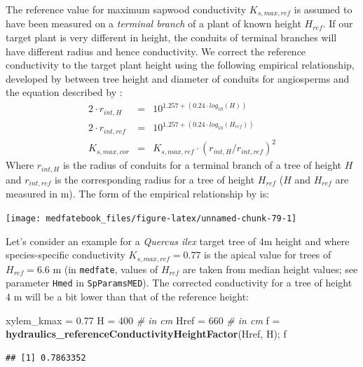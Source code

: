 \documentclass[]{book}
\newenvironment{Shaded}{\begin{snugshade}}{\end{snugshade}}
\newcommand{\KeywordTok}[1]{\textcolor[rgb]{0.13,0.29,0.53}{\textbf{#1}}}
\newcommand{\DecValTok}[1]{\textcolor[rgb]{0.00,0.00,0.81}{#1}}
\newcommand{\FloatTok}[1]{\textcolor[rgb]{0.00,0.00,0.81}{#1}}
\newcommand{\StringTok}[1]{\textcolor[rgb]{0.31,0.60,0.02}{#1}}
\newcommand{\CommentTok}[1]{\textcolor[rgb]{0.56,0.35,0.01}{\textit{#1}}}
\newcommand{\NormalTok}[1]{#1}
\begin{document}
The reference value for maximum sapwood conductivity \(K_{s,max,ref}\) is assumed to have been measured on a \emph{terminal branch} of a plant of known height \(H_{ref}\). If our target plant is very different in height, the conduits of terminal branches will have different radius and hence conductivity. We correct the reference conductivity to the target plant height using the following empirical relationship, developed by \citet{Olson2014} between tree height and diameter of conduits for angiosperms and the equation described by \citet{Christoffersen2016}:
\begin{eqnarray}
2 \cdot r_{int,H}&=& 10^{1.257+(0.24\cdot log_{10}(H))} \\
2 \cdot r_{int,ref}&=&10^{1.257+(0.24\cdot log_{10}(H_{ref}))}\\
K_{s,max,cor}&=&K_{s,max,ref}\cdot (r_{int,H}/r_{int,ref})^{2}
\end{eqnarray}
Where \(r_{int,H}\) is the radius of conduits for a terminal branch of a tree of height \(H\) and \(r_{int,ref}\) is the corresponding radius for a tree of height \(H_{ref}\) (\(H\) and \(H_{ref}\) are measured in m). The form of the empirical relationship by \citet{Olson2014} is:

\begin{center}\texttt{[image: medfatebook\_files/figure-latex/unnamed-chunk-79-1]} \end{center}

Let's consider an example for a \emph{Quercus ilex} target tree of 4m height and where species-specific conductivity \(K_{s,max,ref} = 0.77\) is the apical value for trees of \(H_{ref} = 6.6\) m (in \texttt{medfate}, values of \(H_{ref}\) are taken from median height values; see parameter \texttt{Hmed} in \texttt{SpParamsMED}). The corrected conductivity for a tree of height 4 m will be a bit lower than that of the reference height:

\begin{Shaded}
\begin{Highlighting}[]
\NormalTok{xylem_kmax =}\StringTok{ }\FloatTok{0.77}
\NormalTok{H =}\StringTok{ }\DecValTok{400} \CommentTok{# in cm}
\NormalTok{Href =}\StringTok{ }\DecValTok{660} \CommentTok{# in cm}
\NormalTok{f =}\StringTok{ }\KeywordTok{hydraulics_referenceConductivityHeightFactor}\NormalTok{(Href, H);}
\NormalTok{f}
\end{Highlighting}
\end{Shaded}

\begin{verbatim}
## [1] 0.7863352
\end{verbatim}
\end{document}
